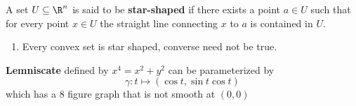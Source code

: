 \documentclass[11pt]{article}
\begin{document}
\begin{defn*}
  A set $U\subseteq \R^n$ is said to be \textbf{star-shaped} if there exists a point $a\in U$ such that for every point $x\in U$ the straight line connecting $x$ to $a$ is contained in $U$.
  \begin{enumerate}
    \item Every convex set is star shaped, converse need not be true.
  \end{enumerate}
\end{defn*}

\begin{example}
  \textbf{Lemniscate} defined by $x^4 = x^2 + y^2$ can be parameterized by
  \[
    \gamma: t \mapsto (\cos t, \sin t\cos t)
  \]
  which has a 8 figure graph that is not smooth at $(0,0)$
\end{example}
\end{document}
